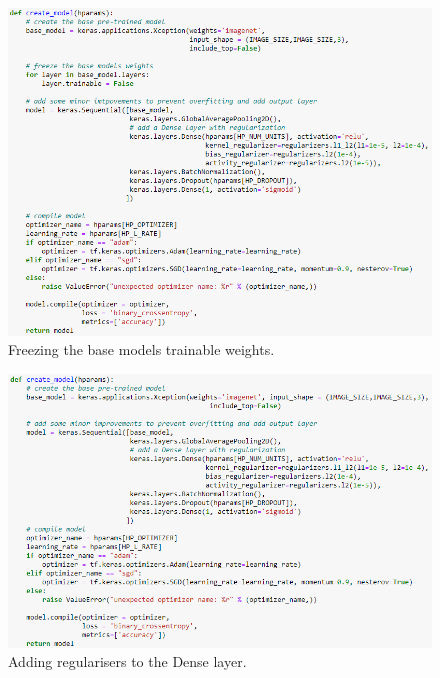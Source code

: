 \begin{figure}[H]
    \centering
    \includegraphics[width=\textwidth]{figures/xception-improvement-1.png}
    \caption{Freezing the base models trainable weights.}
    \label{fig:xception-improvement-1}
\end{figure}
\begin{figure}[H]
    \centering
    \includegraphics[width=\textwidth]{figures/xception-improvement-2.png}
    \caption{Adding regularisers to the Dense layer.}
    \label{fig:xception-improvement-2}
\end{figure}
